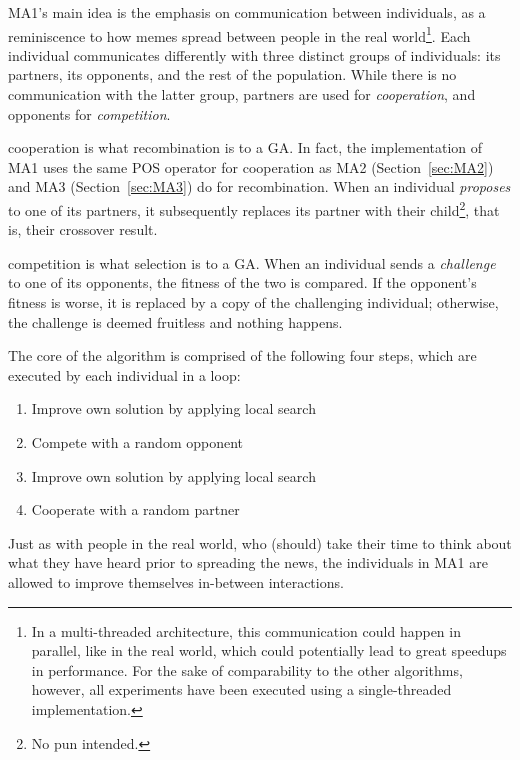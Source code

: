 \documentclass[thesis.tex]{subfiles}
\begin{document}
\gls{MA1}'s main idea is the emphasis on communication between individuals, as a reminiscence to how memes spread between people in the real world\footnote{In a multi-threaded architecture, this communication could happen in parallel, like in the real world, which could potentially lead to great speedups in performance. For the sake of comparability to the other algorithms, however, all experiments have been executed using a single-threaded implementation.}. Each individual communicates differently with three distinct groups of individuals: its \glspl{partner}, its \glspl{opponent}, and the rest of the population. While there is no communication with the latter group, partners are used for \emph{cooperation}, and opponents for \emph{competition}.

\Gls{cooperation} is what recombination is to a \gls{GA}. In fact, the implementation of \gls{MA1} uses the same \gls{POS} operator for cooperation as \gls{MA2} (Section~\ref{sec:MA2}) and \gls{MA3} (Section~\ref{sec:MA3}) do for recombination. When an individual \emph{proposes} to one of its partners, it subsequently replaces its partner with their child\footnote{No pun intended.}, that is, their crossover result.

\Gls{competition} is what selection is to a \gls{GA}. When an individual sends a \emph{challenge} to one of its opponents, the fitness of the two is compared. If the opponent's fitness is worse, it is replaced by a copy of the challenging individual; otherwise, the challenge is deemed fruitless and nothing happens.

The core of the algorithm is comprised of the following four steps, which are executed by each individual in a loop:
\begin{enumerate}\itemsep0em
   \item Improve own solution by applying local search
   \item Compete with a random opponent
   \item Improve own solution by applying local search
   \item Cooperate with a random partner
\end{enumerate}
Just as with people in the real world, who (should) take their time to think about what they have heard prior to spreading the news, the individuals in \gls{MA1} are allowed to improve themselves in-between interactions.
\end{document}
